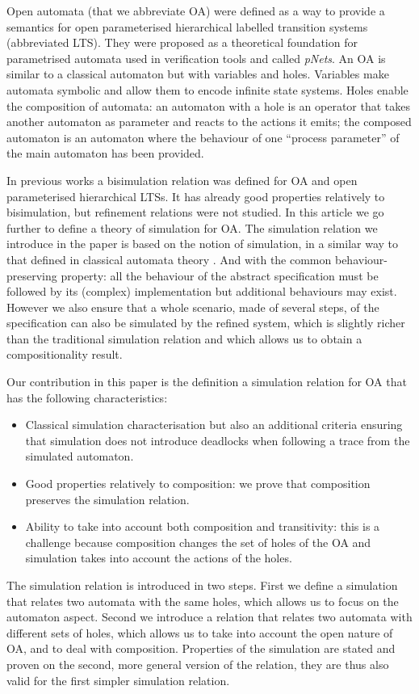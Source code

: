 \documentclass[runningheads]{llncs}
\begin{document}
Open automata (that we abbreviate OA) were defined as a way to provide a semantics for open parameterised hierarchical labelled transition systems (abbreviated LTS). They were proposed as a theoretical foundation for parametrised automata used in verification tools and called \emph{pNets}.
An OA \cite{henrio:01299562} is similar to a classical automaton but with variables and holes. Variables make automata symbolic and allow them to encode infinite state systems. Holes enable the composition of automata: an automaton with a hole is an operator that takes another automaton as parameter and reacts to the actions it emits; the composed automaton is an automaton where the behaviour of one ``process parameter'' %
 of the main automaton has been provided.

In previous works \cite{AMHEEMA:2023,wang:03126313} a bisimulation relation was defined for OA and open parameterised hierarchical LTSs. It has already good properties relatively to bisimulation, but refinement relations were not studied. In this article we go further to  define a theory of simulation for OA. The simulation relation we introduce in the paper  is based on the notion of   simulation,  in a similar way to that defined in classical automata theory \cite{Milner:1989,Bellegarde:2000}.  And with the common behaviour-preserving  property:  all the behaviour of the abstract specification must be followed by its (complex) implementation but additional behaviours may exist. However we also ensure that a whole scenario, made of several steps, of the specification can also be simulated by the refined system, which is slightly richer than the traditional simulation relation and which allows us to obtain a compositionality result.

Our contribution in this paper is the definition a simulation relation for OA that has the following characteristics:
\begin{itemize}
\item Classical simulation characterisation but also an additional criteria ensuring that simulation does not introduce deadlocks when following a trace from the simulated automaton.
\item Good properties relatively to composition: we prove that composition preserves the simulation relation.
\item Ability to take into account both composition and transitivity: this is a challenge because composition changes the set of holes of the OA and simulation takes into account the actions of the holes.
\end{itemize}
 The simulation relation is introduced in two steps. First we define a simulation that relates two automata with the same holes, which allows us to focus on the automaton aspect. Second we introduce a relation that relates two automata with different sets of holes, which allows us to take into account the open nature of OA, and to deal with composition. Properties of the simulation are stated and proven on the second, more general version of the relation, they are thus also valid for the first simpler simulation relation.
\end{document}
